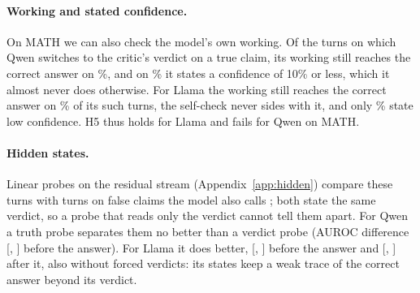 \paragraph{Working and stated confidence.}
On MATH we can also check the model's own working.
Of the \QwenMathWorkN{} turns on which Qwen switches to the critic's verdict on a true claim, its working still reaches the correct answer on \QwenMathWorkOk\%, and on \QwenMathWorkLowConf\% it states a confidence of 10\% or less, which it almost never does otherwise.
For Llama the working still reaches the correct answer on \LlamaMathWorkOk\% of its \LlamaMathWorkN{} such turns, the self-check never sides with it, and only \LlamaMathWorkLowConf\% state low confidence.
H5 thus holds for Llama and fails for Qwen on MATH.

\paragraph{Hidden states.}
Linear probes on the residual stream (Appendix~\ref{app:hidden}) compare these turns with turns on false claims the model also calls \Invalid; both state the same verdict, so a probe that reads only the verdict cannot tell them apart.
For Qwen a truth probe separates them no better than a verdict probe (AUROC difference \QwenMathHidPreAucDiff{} [\QwenMathHidPreAucDiffLo, \QwenMathHidPreAucDiffHi] before the answer).
For Llama it does better, \LlamaMathHidPreAucDiff{} [\LlamaMathHidPreAucDiffLo, \LlamaMathHidPreAucDiffHi] before the answer and \LlamaMathHidPostAucDiff{} [\LlamaMathHidPostAucDiffLo, \LlamaMathHidPostAucDiffHi] after it, also without forced verdicts: its states keep a weak trace of the correct answer beyond its verdict.
